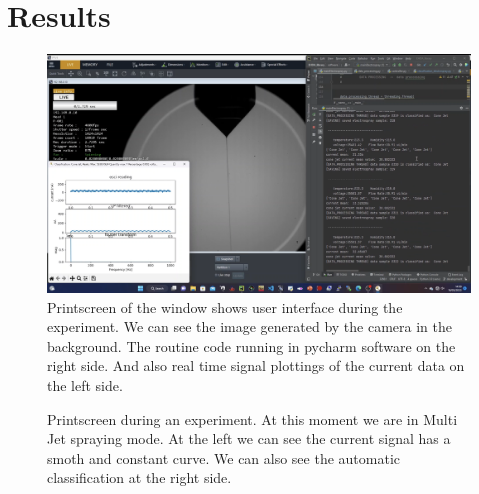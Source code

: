 \chapter{Results}
\label{chap:Results}

\begin{figure}[H]
    \center
    \includegraphics[width=17cm]{Figuras/19:03/axs1.png}
    \caption{Printscreen of the window shows user interface during the experiment.
        We can see the image generated by the camera in the background.
        The routine code running in pycharm software on the right side.
        And also real time signal plottings of the current data on the left side.}
\end{figure}


\begin{figure}[H]
    \centering
    \caption{Printscreen during an experiment. At this moment we are in Multi Jet spraying mode. At the left we can see the current signal has a smoth and constant curve. We can also see the automatic classification at the right side.}
    \label{fig:multi_class_exp}
\end{figure}


